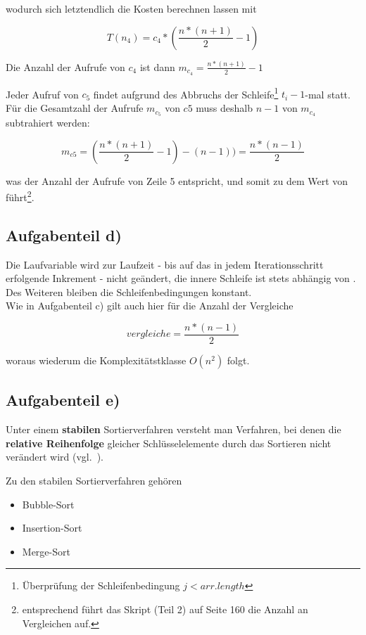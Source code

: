 \noindent
wodurch sich letztendlich die Kosten berechnen lassen mit

\begin{equation}
    T(n_4) = c_4 * (\frac{n * (n + 1)}{2} - 1)
\end{equation}

\noindent
Die Anzahl der Aufrufe von $c_4$ ist dann $m_{c_4} = \frac{n * (n + 1)}{2} - 1$


\noindent
Jeder Aufruf von $c_5$ findet aufgrund des Abbruchs der Schleife\footnote{
    Überprüfung der Schleifenbedingung $j < arr.length$
} $t_i - 1$-mal statt.\\
Für die Gesamtzahl der Aufrufe $m_{c_5}$ von $c5$ muss deshalb $n-1$ von $m_{c_4}$ subtrahiert werden:

\begin{equation}
    m_{c5} = (\frac{n * (n + 1)}{2} - 1) - (n-1)) = \frac{n * (n - 1)}{2}
\end{equation}

\noindent
was der Anzahl der Aufrufe von Zeile 5 entspricht, und somit zu dem Wert von  führt\footnote{
    entsprechend führt das Skript (Teil 2) auf Seite 160 die Anzahl an Vergleichen auf.
}.


\subsection{Aufgabenteil d)}

Die Laufvariable  wird zur Laufzeit - bis auf das in jedem Iterationsschritt erfolgende Inkrement - nicht geändert, die innere Schleife ist stets abhängig von .\\
Des Weiteren bleiben die Schleifenbedingungen konstant.\\

\noindent
Wie in Aufgabenteil c) gilt auch hier für die Anzahl der Vergleiche

\begin{equation}
    vergleiche = \frac{n * (n - 1)}{2}
\end{equation}

\noindent
woraus wiederum die Komplexitätstklasse $O(n^2)$ folgt.


\subsection{Aufgabenteil e)}
Unter einem \textbf{stabilen} Sortierverfahren versteht man Verfahren, bei denen die \textbf{relative Reihenfolge} gleicher Schlüsselelemente durch das Sortieren nicht verändert wird (vgl.~\cite[210]{CL22}).

\noindent
Zu den stabilen Sortierverfahren gehören

\begin{itemize}
    \item Bubble-Sort
    \item Insertion-Sort
    \item Merge-Sort
\end{itemize}

